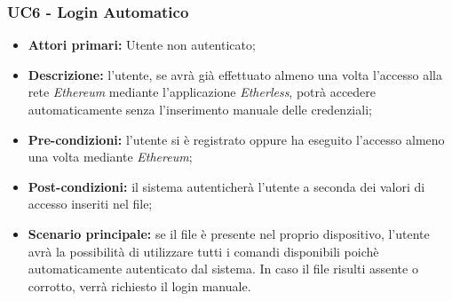 \subsubsection{UC6 - Login Automatico}
\begin{itemize}
	\item \textbf{Attori primari:} Utente non autenticato;
	\item \textbf{Descrizione:} l'utente, se avrà già effettuato almeno una volta l'accesso alla rete \textit{Ethereum\glo} mediante l'applicazione \textit{Etherless}, potrà accedere automaticamente senza l'inserimento manuale delle credenziali; 
	\item \textbf{Pre-condizioni:} l'utente si è registrato oppure ha eseguito l'accesso almeno una volta mediante \textit{Ethereum};
	\item \textbf{Post-condizioni:} il sistema autenticherà l'utente a seconda dei valori di accesso inseriti nel file;
	\item \textbf{Scenario principale:} se il file è presente nel proprio dispositivo, l'utente avrà la possibilità di utilizzare tutti i comandi disponibili poichè automaticamente autenticato dal sistema. In caso il file risulti assente o corrotto, verrà richiesto il login manuale.
\end{itemize}